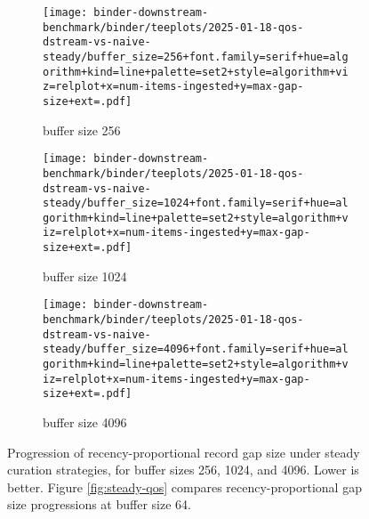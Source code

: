 \begin{figure}
\begin{subfigure}{0.6\linewidth}
\texttt{[image: binder-downstream-benchmark/binder/teeplots/2025-01-18-qos-dstream-vs-naive-steady/buffer\_size=256+font.family=serif+hue=algorithm+kind=line+palette=set2+style=algorithm+viz=relplot+x=num-items-ingested+y=max-gap-size+ext=.pdf]}
\caption{buffer size 256}
\end{subfigure}
\begin{subfigure}{0.6\linewidth}
\texttt{[image: binder-downstream-benchmark/binder/teeplots/2025-01-18-qos-dstream-vs-naive-steady/buffer\_size=1024+font.family=serif+hue=algorithm+kind=line+palette=set2+style=algorithm+viz=relplot+x=num-items-ingested+y=max-gap-size+ext=.pdf]}
\caption{buffer size 1024}
\end{subfigure}
\begin{subfigure}{0.6\linewidth}
\texttt{[image: binder-downstream-benchmark/binder/teeplots/2025-01-18-qos-dstream-vs-naive-steady/buffer\_size=4096+font.family=serif+hue=algorithm+kind=line+palette=set2+style=algorithm+viz=relplot+x=num-items-ingested+y=max-gap-size+ext=.pdf]}
\caption{buffer size 4096}
\end{subfigure}
\caption{%
Progression of recency-proportional record gap size under steady curation strategies, for buffer sizes 256, 1024, and 4096.
\footnotesize
Lower is better.
Figure \ref{fig:steady-qos} compares recency-proportional gap size progressions at buffer size 64.
}
\label{fig:steady-qos-supp}
\end{figure}
